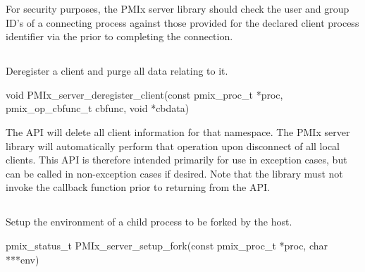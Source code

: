 \adviceimplstart
For security purposes, the \ac{PMIx} server library should check the user and group ID's of a connecting process against those provided for the declared client process identifier via the  prior to completing the connection.
\adviceimplend

\subsection{}

\summary

Deregister a client and purge all data relating to it.

\format

\cspecificstart
\begin{codepar}
void
PMIx_server_deregister_client(const pmix_proc_t *proc,
                        pmix_op_cbfunc_t cbfunc, void *cbdata)
\end{codepar}
\cspecificend

\begin{arglist}
\end{arglist}


\descr

The  \ac{API} will delete all client information for that namespace. The \ac{PMIx} server library will automatically perform that operation upon disconnect of all local clients.
This \ac{API} is therefore intended primarily for use in exception cases, but can be called in non-exception cases if desired. Note that the library must not invoke the callback function prior to returning from the \ac{API}.


\subsection{}

\summary

Setup the environment of a child process to be forked by the host.

\format

\cspecificstart
\begin{codepar}
pmix_status_t
PMIx_server_setup_fork(const pmix_proc_t *proc,
                        char ***env)
\end{codepar}
\cspecificend

